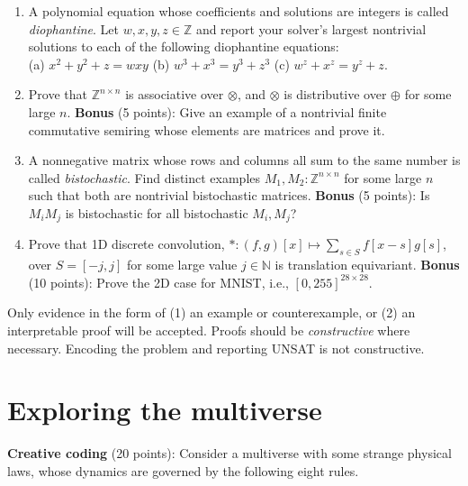 \documentclass[11pt]{article}
\begin{document}
    \begin{enumerate}
        \item A polynomial equation whose coefficients and solutions are integers is called \textit{diophantine}. Let $w, x, y, z \in \mathbb{Z}$ and report your solver's largest nontrivial solutions to each of the following diophantine equations:\\ (a) $x^2+y^2+z = wxy$ (b) $w^3 + x^3 = y^3+z^3$ (c) $w^z + x^z = y^z + z$.
        \item Prove that $\mathbb{Z}^{n\times n}$ is associative over $\otimes$, and $\otimes$ is distributive over $\oplus$ for some large $n$. \textbf{Bonus} (5 points): Give an example of a nontrivial finite commutative semiring whose elements are matrices and prove it.
        \item A nonnegative matrix whose rows and columns all sum to the same number is called \textit{bistochastic}. Find distinct examples $M_1, M_2: \mathbb{Z}^{n\times n}$ for some large $n$ such that both are nontrivial bistochastic matrices. \textbf{Bonus} (5 points): Is $M_i M_j$ is bistochastic for all bistochastic $M_i, M_j$?
        \item Prove that 1D discrete convolution, $*: (f, g)[x] \mapsto \sum_{s \in S}f[x-s]g[s]$, over $S=[-j, j]$ for some large value $j \in \mathbb{N}$ is translation equivariant. \textbf{Bonus} (10 points): Prove the 2D case for MNIST, i.e., $[0, 255]^{28\times 28}$.
    \end{enumerate}

    \noindent Only evidence in the form of (1) an example or counterexample, or (2) an interpretable proof will be accepted. Proofs should be \textit{constructive} where necessary. Encoding the problem and reporting UNSAT is not constructive.\pagebreak

    \section {Exploring the multiverse}
    \textbf{Creative coding} (20 points): Consider a multiverse with some strange physical laws, whose dynamics are governed by the following eight rules.\\
\end{document}
